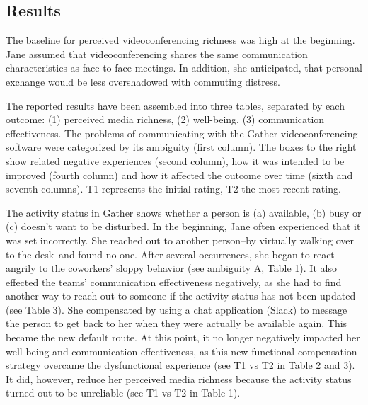 \documentclass[man]{apa7}
\begin{document}
\subsection{Results}

The baseline for perceived videoconferencing richness was high at the beginning. Jane assumed that videoconferencing shares the same communication characteristics as face-to-face meetings. In addition, she anticipated, that personal exchange would be less overshadowed with commuting distress.

The reported results have been assembled into three tables, separated by each outcome: (1) perceived media richness, (2) well-being, (3) communication effectiveness. The problems of communicating with the Gather videoconferencing software were categorized by its ambiguity (first column). The boxes to the right show related negative experiences (second column), how it was intended to be improved (fourth column) and how it affected the outcome over time (sixth and seventh columns). T1 represents the initial rating, T2 the most recent rating.

The activity status in Gather shows whether a person is (a) available, (b) busy or (c) doesn't want to be disturbed. In the beginning, Jane often experienced that it was set incorrectly. She reached out to another person–by virtually walking over to the desk–and found no one. After several occurrences, she began to react angrily to the coworkers' sloppy behavior (see ambiguity A, Table 1). It also effected the teams' communication effectiveness negatively, as she had to find another way to reach out to someone if the activity status has not been updated (see Table 3). She compensated by using a chat application (Slack) to message the person to get back to her when they were actually be available again. This became the new default route. At this point, it no longer negatively impacted her well-being and communication effectiveness, as this new functional compensation strategy overcame the dysfunctional experience (see T1 vs T2 in Table 2 and 3). It did, however, reduce her perceived media richness because the activity status turned out to be unreliable (see T1 vs T2 in Table 1). 
\end{document}
